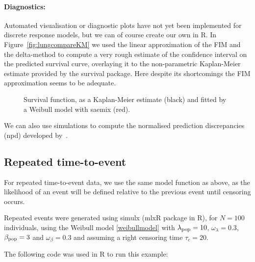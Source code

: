 \paragraph{Diagnostics:} Automated visualisation or diagnostic plots have not yet been implemented for discrete response models, but we can of course create our own in R. In Figure~\ref{fig:lungcompareKM} we used the linear approximation of the FIM and the delta-method to compute a very rough estimate of the confidence interval on the predicted survival curve, overlaying it to the non-parametric Kaplan-Meier estimate provided by the {\sf survival} package. Here despite its shortcomings the FIM approximation seems to be adequate.

\begin{figure}[!h]
\begin{center}
\end{center}
\par \kern -0.5cm
\caption{Survival function, as a Kaplan-Meier estimate (black) and fitted by a Weibull model with {\sf saemix} (red).} \label{fig:compareKM}
\end{figure}

We can also use simulations to compute the normalised prediction discrepancies (npd) developed by~\cite{Cerou18}.

\subsection{Repeated time-to-event}

For repeated time-to-event data, we use the same model function as above, as the likelihood of an event will be defined relative to the previous event until censoring occurs.

Repeated events were generated using simulx (mlxR package in R), for $N=100$ individuals, using the Weibull model \eqref{weibullmodel} with $\lambda_{\rm pop} = 10$, $\omega_{\lambda} = 0.3$, $\beta_{\rm pop} = 3$ and $\omega_{\beta} = 0.3$ and assuming a right censoring time $\tau_c = 20$.

The following code was used in R to run this example:


